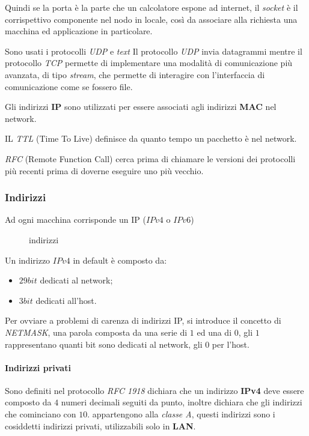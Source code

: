 Quindi se la porta è la parte che un calcolatore espone ad internet, il
\emph{socket} è il corrispettivo componente nel nodo in locale, così da
associare alla richiesta una macchina ed applicazione in particolare.


Sono usati i protocolli \emph{UDP} e \emph{text}
Il protocollo \emph{UDP} invia datagrammi mentre il protocollo \emph{TCP}
permette di implementare una modalità di comunicazione più avanzata, di tipo
\emph{stream}, che permette di interagire con l'interfaccia di comunicazione
come se fossero file.

Gli indirizzi \textbf{IP} sono utilizzati per essere associati agli indirizzi
\textbf{MAC} nel network.

IL \emph{TTL} (Time To Live) definisce da quanto tempo un pacchetto è nel
network.

\emph{RFC} (Remote Function Call) cerca prima di chiamare le versioni dei
protocolli più recenti prima di doverne eseguire uno più vecchio.

\subsubsection{Indirizzi}
Ad ogni macchina corrisponde un IP ($IPv4$ o $IPv6$)
\begin{figure}[H]
    \centering
    \caption{indirizzi}
    \label{fig:indirizzi}
\end{figure}

Un indirizzo $IPv4$ in default è composto da:
\begin{itemize}
  \item $29bit$ dedicati al network;
  \item $3bit$ dedicati all'host.
\end{itemize}
Per ovviare a problemi di carenza di indirizzi IP, si introduce il concetto
di \emph{NETMASK}, una parola composta da una serie di $1$ ed una di $0$, gli
$1$ rappresentano quanti bit sono dedicati al network, gli $0$ per l'host.

\paragraph{Indirizzi privati}
Sono definiti nel protocollo \emph{RFC 1918} dichiara che un indirizzo
\textbf{IPv4} deve essere composto da $4$ numeri decimali seguiti da punto,
inoltre dichiara che gli indirizzi che cominciano con $10.$ appartengono alla
\emph{classe A}, questi indirizzi sono i cosiddetti indirizzi privati,
utilizzabili solo in \textbf{LAN}.

